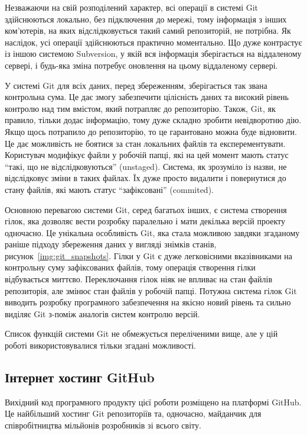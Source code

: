 Незважаючи на свій розподілений характер, всі операції в системі Git здійснюються локально,
без підключення до мережі, тому інформація з інших ком'ютерів, на яких відслідковується
такий самий репозиторій, не потрібна. Як наслідок, усі операції здійснюються практично
моментально. Що дуже контрастує із іншою системою Subversion, у якій вся інформація
зберігається на віддаленому сервері, і будь-яка зміна потребує оновлення на цьому
віддаленому сервері.

У системі Git для всіх даних, перед збереженням, зберігається так звана контрольна сума.
Це дає змогу забезпечити цілісність даних та високий рівень контролю над тим
вмістом, який потрапляє до репозиторію. Також, Git, як правило, тільки додає
інформацію, тому дуже складно зробити невідворотню дію. Якщо щось потрапило до
репозиторію, то це гарантовано можна буде відновити. Це дає можливість не боятися
за стан локальних файлів та експерементувати. Користувач модифікує файли у робочій папці,
які на цей момент мають статус ``такі, що не відслідковуються'' (unstaged). Система,
як зрозуміло із назви, не відслідковує зміни в таких файлах. Їх дуже просто видалити
і повернутися до стану файлів, які мають статус ``зафіксовані'' (commited).

Основною перевагою системи Git, серед багатьох інших, є система створення гілок, яка
дозволяє вести розробку паралельно і мати декілька версій проекту одночасно. Це унікальна
особливість Git, яка стала можливою завдяки згаданому раніше підходу збереження даних
у вигляді знімків станів, рисунок~\ref{img:git_snapshots}. Гілки у Git є дуже легковісними
вказівниками на контрольну суму зафіксованих файлів, тому операція створення гілки
відбувається миттєво. Переключання гілок ніяк не впливає на стан файлів репозиторія,
але змінює стан файлів у робочій папці. Потужна система гілок Git виводить розробку
програмного забезпечення на якісно новий рівень та сильно виділяє Git з-поміж аналогів
систем контролю версій.

Список функцій системи Git не обмежується переліченими вище, але у цій роботі 
використовувалися тільки згадані можливості.

\subsection{Інтернет хостинг GitHub}
Вихідний код програмного продукту цієї роботи розміщено на платформі GitHub.
Це найбільший хостинг Git репозиторіїв та, одночасно, майданчик для співробітництва
мільйонів розробників зі всього світу.


